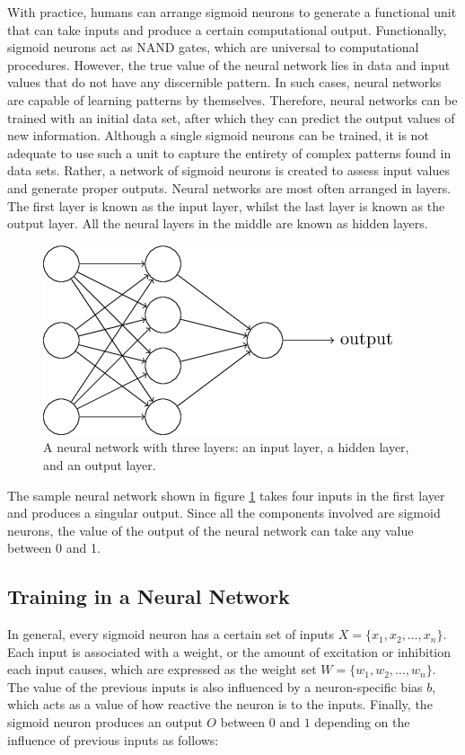 With practice, humans can arrange sigmoid neurons to generate a functional unit that can take inputs and produce a certain computational output.
Functionally, sigmoid neurons act as NAND gates, which are universal to computational procedures.
However, the true value of the neural network lies in data and input values that do not have any discernible pattern.
In such cases, neural networks are capable of learning patterns by themselves.
Therefore, neural networks can be trained with an initial data set, after which they can predict the output values of new information.
Although a single sigmoid neurons can be trained, it is not adequate to use such a unit to capture the entirety of complex patterns found in data sets.
Rather, a network of sigmoid neurons is created to assess input values and generate proper outputs.
Neural networks are most often arranged in layers.
The first layer is known as the input layer, whilst the last layer is known as the output layer.
All the neural layers in the middle are known as hidden layers. 
\begin{figure}[htbp!]
    \centering
    \includegraphics[scale=0.75]{pictures/NeuralNetworks/neuralNetwork.png}
        \caption{A neural network with three layers: an input layer, a hidden layer, and an output layer.}
    \label{fig:neuralNetwork}
\end{figure}
The sample neural network shown in figure \ref{fig:neuralNetwork} takes four inputs in the first layer and produces a singular output.
Since all the components involved are sigmoid neurons, the value of the output of the neural network can take any value between 0 and 1. 

\subsection{Training in a Neural Network}

In general, every sigmoid neuron has a certain set of inputs $X=\{x_1, x_2, \hdots , x_n\}$.
Each input is associated with a weight, or the amount of excitation or inhibition each input causes, which are expressed as the weight set $W=\{w_1, w_2, \hdots , w_n\}$.
The value of the previous inputs is also influenced by a neuron-specific bias $b$, which acts as a value of how reactive the neuron is to the inputs.
Finally, the sigmoid neuron produces an output $O$ between $0$ and $1$ depending on the influence of previous inputs as follows:

